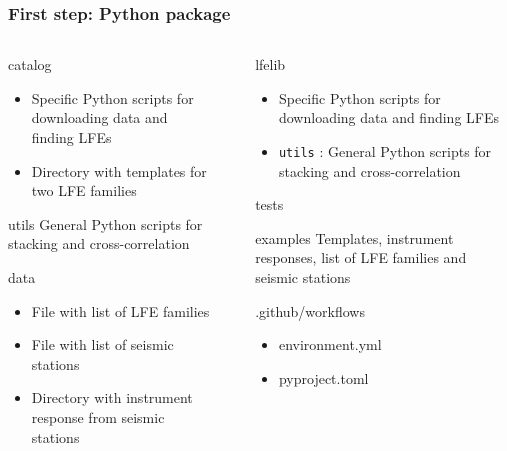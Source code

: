 \documentclass{beamer}
\begin{document}
	\begin{frame}[fragile]
		\frametitle{First step: Python package}
		\scriptsize{
		\begin{columns}[c]
			\begin{column}{5cm}
				\begin{block}{catalog}
				\begin{itemize}
					\item	Specific Python scripts for downloading data and finding LFEs
					\item Directory with templates for two LFE families
				\end{itemize}
				\end{block}
				\begin{block}{utils}
				General Python scripts for stacking and cross-correlation
				\end{block}
				\begin{block}{data}
				\begin{itemize}
					\item File with list of LFE families
					\item File with list of seismic stations
					\item Directory with instrument response from seismic stations
				\end{itemize}
				\end{block}
			\end{column}
			\begin{column}{1cm}
				\centering
				\Huge\pointer
			\end{column}
			\begin{column}{5cm}
				\begin{block}{lfelib}
				\begin{itemize}
					\item Specific Python scripts for downloading data and finding LFEs
					\item \verb+utils+ : General Python scripts for stacking and cross-correlation
				\end{itemize}
				\end{block}
				\begin{block}{tests}
				\end{block}
				\begin{block}{examples}
				Templates, instrument responses, list of LFE families and seismic stations
				\end{block}
				\begin{block}{.github/workflows}
				\end{block}
				\begin{itemize}
					\item environment.yml
					\item pyproject.toml
				\end{itemize}
			\end{column}
		\end{columns}
		}
	\end{frame}
\end{document}
